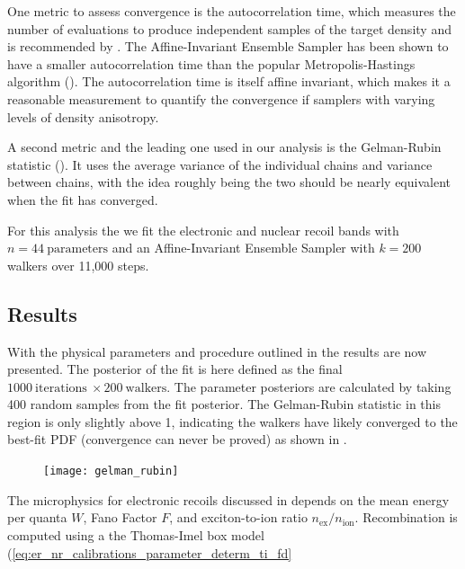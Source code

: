 One metric to assess convergence is the autocorrelation time, which measures the number
of evaluations to produce independent samples of the target density and is recommended by .  The Affine-Invariant
Ensemble Sampler has been shown to have a smaller autocorrelation time than the popular Metropolis-Hastings algorithm
().  The autocorrelation time is itself affine invariant, which makes it a reasonable measurement to quantify
the convergence if samplers with varying levels of density anisotropy.

A second metric and the leading one used in
our analysis is the Gelman-Rubin statistic ().  It uses the average variance of the individual chains and variance
between chains, with the idea roughly being the two should be nearly equivalent when the fit has converged.

For this analysis the we fit the electronic and nuclear recoil bands with  $n = 44\ \mathrm{parameters}$ and an Affine-Invariant Ensemble
Sampler with $k = 200$ walkers over 11,000 steps.



\subsection{Results}
\label{subsec:er_nr_calibrations_results}
With the physical parameters and procedure outlined in  the results are now
presented.  The posterior of the fit is here defined as the final $1000\ \mathrm{iterations}\ \times 200\ \mathrm{walkers}$.  The
parameter posteriors are calculated by taking 400 random samples from the fit posterior.  The Gelman-Rubin statistic in this region is
only slightly above 1, indicating the walkers have likely converged to the best-fit PDF (convergence can never be proved) as shown in
.

\begin{figure}
\centering
\texttt{[image: gelman\_rubin]}
\label{fig:er_nr_calibrations_results_gr}
\end{figure}

The microphysics for electronic recoils discussed in  depends on the mean energy
per quanta $W$, Fano Factor $F$, and exciton-to-ion ratio $n_{\mathrm{ex}} / n_{\mathrm{ion}}$.  Recombination is computed using
a the Thomas-Imel box model (\eqref{eq:er_nr_calibrations_parameter_determ_ti_fd}

